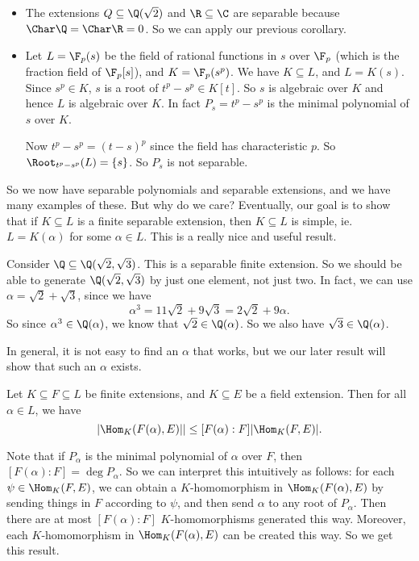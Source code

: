 \documentclass[a4paper]{article}
\begin{document}
\begin{eg}\leavevmode
  \begin{itemize}
    \item The extensions $Q \subseteq \Q(\sqrt{2})$ and $\R \subseteq \C$ are separable because $\Char \Q = \Char \R = 0$. So we can apply our previous corollary.
    \item Let $L = \F_p(s)$ be the field of rational functions in $s$ over $\F_p$ (which is the fraction field of $\F_p[s]$), and $K = \F_p(s^p)$. We have $K \subseteq L$, and $L = K(s)$. Since $s^p \in K$, $s$ is a root of $t^p - s^p \in K[t]$.  So $s$ is algebraic over $K$ and hence $L$ is algebraic over $K$. In fact $P_s = t^p - s^p$ is the minimal polynomial of $s$ over $K$.

      Now $t^p - s^p = (t - s)^p$ since the field has characteristic $p$. So $\Root_{t^p - s^p}(L) = \{s\}$. So $P_s$ is not separable.
  \end{itemize}
\end{eg}
So we now have separable polynomials and separable extensions, and we have many examples of these. But why do we care? Eventually, our goal is to show that if $K\subseteq L$ is a finite separable extension, then $K \subseteq L$ is simple, ie. $L = K(\alpha)$ for some $\alpha \in L$. This is a really nice and useful result.

\begin{eg}
  Consider $\Q \subseteq \Q(\sqrt{2}, \sqrt{3})$. This is a separable finite extension. So we should be able to generate $\Q(\sqrt{2}, \sqrt{3})$ by just one element, not just two. In fact, we can use $\alpha = \sqrt{2} + \sqrt{3}$, since we have
  \[
    \alpha^3 = 11\sqrt{2} + 9\sqrt{3} = 2\sqrt{2} + 9 \alpha.
  \]
  So since $\alpha^3 \in \Q(\alpha)$, we know that $\sqrt{2} \in \Q(\alpha)$. So we also have $\sqrt{3} \in \Q(\alpha)$.
\end{eg}
In general, it is not easy to find an $\alpha$ that works, but we our later result will show that such an $\alpha$ exists.

\begin{lemma}
  Let $K\subseteq F\subseteq L$ be finite extensions, and $K\subseteq E$ be a field extension. Then for all $\alpha \in L$, we have
  \[
    |\Hom_K(F(\alpha), E)|| \leq [F(\alpha): F] |\Hom_K(F, E)|.
  \]
\end{lemma}
Note that if $P_\alpha$ is the minimal polynomial of $\alpha$ over $F$, then $[F(\alpha): F] = \deg P_\alpha$. So we can interpret this intuitively as follows: for each $\psi \in \Hom_K(F, E)$, we can obtain a $K$-homomorphism in $\Hom_K(F(\alpha), E)$ by sending things in $F$ according to $\psi$, and then send $\alpha$ to any root of $P_\alpha$. Then there are at most $[F(\alpha): F]$ $K$-homomorphisms generated this way. Moreover, each $K$-homomorphism in $\Hom_K(F(\alpha), E)$ can be created this way. So we get this result.
\end{document}
